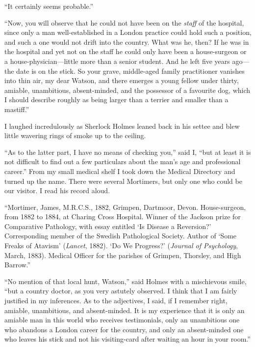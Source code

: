\documentclass[paper=5.5in:8.5in,BCOR=7mm,twoside,DIV=calc,12pt,usegeometry,openany,chapterprefix,endperiod,headings=big]{scrbook} %
\begin{document}
\enquote{It certainly seems probable.}

\enquote{Now, you will observe that he could not have been on the \emph{staff} of the hospital, since only a man well-established in a London practice could hold such a position, and such a one would not drift into the country. What was he, then? If he was in the hospital and yet not on the staff he could only have been a house-surgeon or a house-physician---little more than a senior student. And he left five years ago---the date is on the stick. So your grave, middle-aged family practitioner vanishes into thin air, my dear Watson, and there emerges a young fellow under thirty, amiable, unambitious, absent-minded, and the possessor of a favourite dog, which I should describe roughly as being larger than a terrier and smaller than a mastiff.}

I laughed incredulously as Sherlock Holmes leaned back in his settee and blew little wavering rings of smoke up to the ceiling.

\enquote{As to the latter part, I have no means of checking you,} said I, \enquote{but at least it is not difficult to find out a few particulars about the man's age and professional career.} From my small medical shelf I took down the Medical Directory and turned up the name. There were several Mortimers, but only one who could be our visitor. I read his record aloud.

\enquote{Mortimer, James, M.R.C.S., 1882, Grimpen, Dartmoor, Dev\-on. House-surgeon, from 1882 to 1884, at Charing Cross Hospital. Winner of the Jackson prize for Comparative Pathology, with essay entitled \enquote{Is Disease a Reversion?} Corresponding member of the Swedish Pathological Society. Author of \enquote{Some Freaks of Atavism} (\textit{Lancet}, 1882). \enquote{Do We Progress?} (\textit{Journal of Psychology}, March, 1883). Medical Officer for the parishes of Grimpen, Thorsley, and High Barrow.}

\enquote{No mention of that local hunt, Watson,} said Holmes with a mischievous smile, \enquote{but a country doctor, as you very astutely observed. I think that I am fairly justified in my inferences. As to the adjectives, I said, if I remember right, amiable, unambitious, and absent-minded. It is my experience that it is only an amiable man in this world who receives testimonials, only an unambitious one who abandons a London career for the country, and only an absent-minded one who leaves his stick and not his visiting-card after waiting an hour in your room.}
\end{document}
